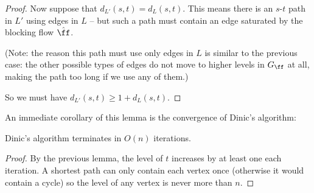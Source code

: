 \begin{proof}
  Now suppose that $d_{L'}(s, t) = d_L(s, t)$. This means there is an $s$-$t$ path in $L'$ using
  edges in $L$ -- but such a path must contain an edge saturated by
  the blocking flow $\hat{\ff}$.

  (Note: the reason this path must use only edges in $L$ is similar to
  the previous case: the other possible types of edges do not move
  to higher levels in $G_{\ff}$ at all, making the path too long if we use any of them.)

  So we must have $d_{L'}(s, t) \geq 1 + d_L(s, t)$.
\end{proof}
An immediate corollary of this lemma is the convergence of Dinic's algorithm:
\begin{theorem}
  Dinic's algorithm terminates in $O(n)$ iterations.
\end{theorem}
\begin{proof}
  By the previous lemma, the level of $t$ increases by at least one each iteration. A shortest path
  can only contain each vertex once (otherwise it would contain a cycle) so the level of any vertex
  is never more than $n$.
\end{proof}

